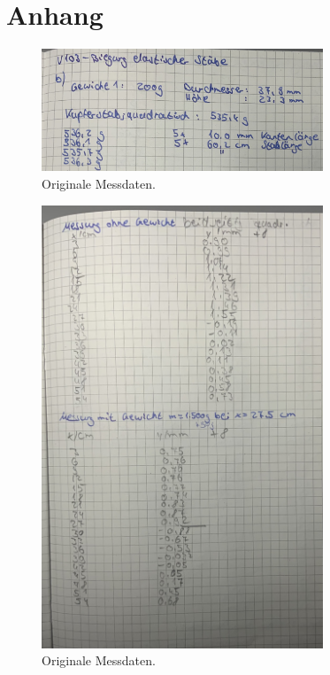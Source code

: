 \section{Anhang}
\label{sec:anhang}

\begin{figure}
  \centering
  \includegraphics[width=0.75\textwidth]{Dateien/Bild1.jpeg}
  \caption{Originale Messdaten.}
  \label{fig:daten1}
\end{figure}

\begin{figure}
    \centering
    \includegraphics[width=0.75\textwidth]{Dateien/Bild2.jpeg}
    \caption{Originale Messdaten.}
    \label{fig:daten2}
\end{figure}

